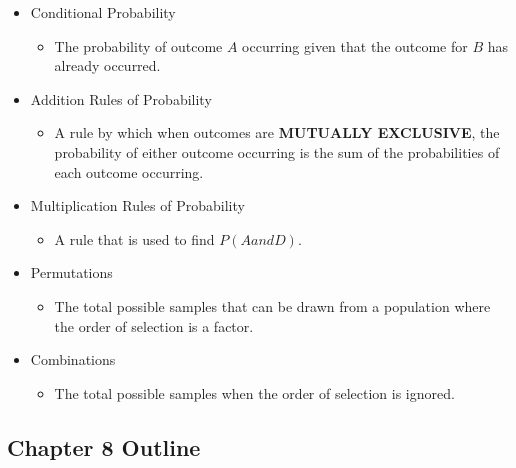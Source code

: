 \documentclass[]{article}
\begin{document}
\begin{itemize}
\itemsep1pt\parskip0pt
\item
  Conditional Probability

  \begin{itemize}
  \itemsep1pt\parskip0pt
  \item
    The probability of outcome $A$ occurring given that the outcome for
    $B$ has already occurred.
  \end{itemize}
\item
  Addition Rules of Probability

  \begin{itemize}
  \itemsep1pt\parskip0pt
  \item
    A rule by which when outcomes are \textbf{MUTUALLY EXCLUSIVE}, the
    probability of either outcome occurring is the sum of the
    probabilities of each outcome occurring.
  \end{itemize}
\item
  Multiplication Rules of Probability

  \begin{itemize}
  \itemsep1pt\parskip0pt
  \item
    A rule that is used to find $P(A and D)$.
  \end{itemize}
\item
  Permutations

  \begin{itemize}
  \itemsep1pt\parskip0pt
  \item
    The total possible samples that can be drawn from a population where
    the order of selection is a factor.
  \end{itemize}
\item
  Combinations

  \begin{itemize}
  \itemsep1pt\parskip0pt
  \item
    The total possible samples when the order of selection is ignored.
  \end{itemize}
\end{itemize}

\subsection{Chapter 8 Outline}\label{chapter-8-outline}
\end{document}
